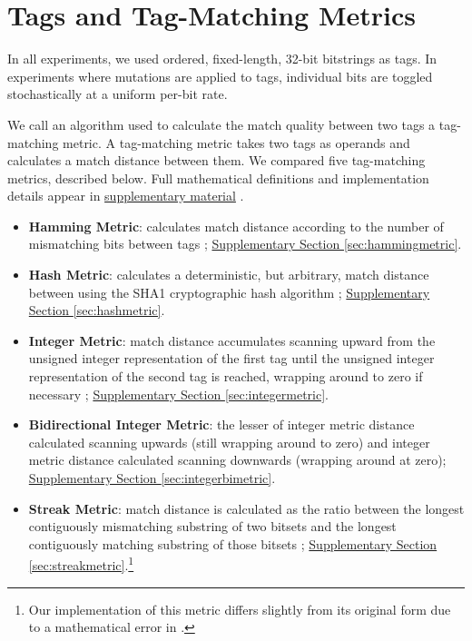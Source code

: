 \section{Tags and Tag-Matching Metrics}

In all experiments, we used ordered, fixed-length, 32-bit bitstrings as tags.
In experiments where mutations are applied to tags, individual bits are toggled stochastically at a uniform per-bit rate.

We call an algorithm used to calculate the match quality between two tags a tag-matching metric.
A tag-matching metric takes two tags as operands and calculates a match distance between them.
We compared five tag-matching metrics, described below.
Full mathematical definitions and implementation details appear in \href{doi.org/10.17605/OSF.IO/GW5MC}{supplementary material} \citep{Moreno_Ofria_2020}.

\begin{itemize}
  \itemsep0em
  \item \textbf{Hamming Metric}: calculates match distance according to the number of mismatching bits between tags \citep{lalejini2019else, hamming1950error}; \href{doi.org/10.17605/OSF.IO/GW5MC}{Supplementary Section \ref{sec:hammingmetric}}.
  \item \textbf{Hash Metric}: calculates a deterministic, but arbitrary, match distance between using the SHA1 cryptographic hash algorithm \citep{eastlake2001us}; \href{doi.org/10.17605/OSF.IO/GW5MC}{Supplementary Section \ref{sec:hashmetric}}.
  \item \textbf{Integer Metric}: match distance accumulates scanning upward from the unsigned integer representation of the first tag until the unsigned integer representation of the second tag is reached, wrapping around to zero if necessary \citep{spector2011tag}; \href{doi.org/10.17605/OSF.IO/GW5MC}{Supplementary Section \ref{sec:integermetric}}.
  \item \textbf{Bidirectional Integer Metric}: the lesser of integer metric distance calculated scanning upwards (still wrapping around to zero) and integer metric distance calculated scanning downwards (wrapping around at zero); \href{doi.org/10.17605/OSF.IO/GW5MC}{Supplementary Section \ref{sec:integerbimetric}}.
  \item \textbf{Streak Metric}: match distance is calculated as the ratio between the longest contiguously mismatching substring of two bitsets and the longest contiguously matching substring of those bitsets \citep{downing2015intelligence}; \href{doi.org/10.17605/OSF.IO/GW5MC}{Supplementary Section \ref{sec:streakmetric}}.\footnote{Our implementation of this metric differs slightly from its original form due to a mathematical error in \citep{downing2015intelligence}.}
\end{itemize}

